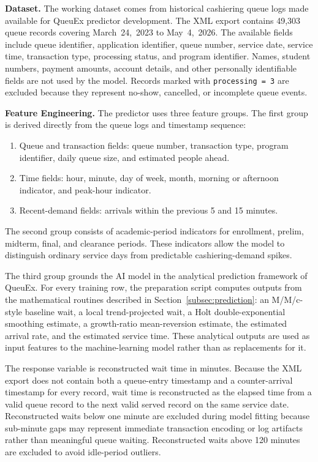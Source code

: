\documentclass{research}
\newcommand{\sysname}{QueuEx}
\begin{document}
\textbf{Dataset.} The working dataset comes from historical cashiering
queue logs made available for \sysname{} predictor development. The XML
export contains 49,303 queue records covering March~24,~2023 to
May~4,~2026. The available fields include queue identifier, application
identifier, queue number, service date, service time, transaction type,
processing status, and program identifier. Names, student numbers,
payment amounts, account details, and other personally identifiable
fields are not used by the model. Records marked with
\texttt{processing = 3} are excluded because they represent no-show,
cancelled, or incomplete queue events.

\textbf{Feature Engineering.} The predictor uses three feature groups.
The first group is derived directly from the queue logs and timestamp
sequence:
\begin{enumerate}
  \item Queue and transaction fields: queue number, transaction type,
        program identifier, daily queue size, and estimated people
        ahead.
  \item Time fields: hour, minute, day of week, month, morning or
        afternoon indicator, and peak-hour indicator.
  \item Recent-demand fields: arrivals within the previous 5 and
        15 minutes.
\end{enumerate}
The second group consists of academic-period indicators for enrollment,
prelim, midterm, final, and clearance periods. These indicators allow
the model to distinguish ordinary service days from predictable
cashiering-demand spikes.

The third group grounds the AI model in the analytical prediction
framework of \sysname{}. For every training row, the preparation script
computes outputs from the mathematical routines described in
Section~\ref{subsec:prediction}: an M/M/c-style baseline wait, a
local trend-projected wait, a Holt double-exponential smoothing
estimate, a growth-ratio mean-reversion estimate, the estimated
arrival rate, and the estimated service time. These analytical outputs
are used as input features to the machine-learning model rather than
as replacements for it.

The response variable is reconstructed wait time in minutes. Because
the XML export does not contain both a queue-entry timestamp and a
counter-arrival timestamp for every record, wait time is reconstructed
as the elapsed time from a valid queue record to the next valid served
record on the same service date. Reconstructed waits below one minute
are excluded during model fitting because sub-minute gaps may represent
immediate transaction encoding or log artifacts rather than meaningful
queue waiting. Reconstructed waits above 120 minutes are excluded to
avoid idle-period outliers.
\end{document}
